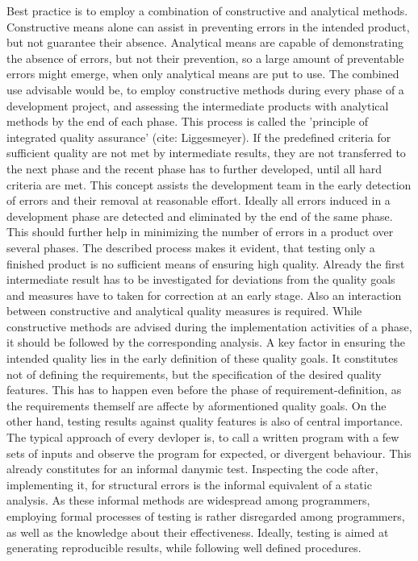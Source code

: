 \documentclass[master,english,smartquotes,apa]{hgbthesis}
\begin{document}
Best practice is to employ a combination of constructive and analytical methods. Constructive means alone can assist in preventing errors in the intended product, but not guarantee their absence. Analytical means are capable of demonstrating the absence of errors, but not their prevention, so a large amount of preventable errors might emerge, when only analytical means are put to use. The combined use advisable would be, to employ constructive methods during every phase of a development project, and assessing the intermediate products with analytical methods by the end of each phase. This process is called the 'principle of integrated quality assurance' (cite: Liggesmeyer). If the predefined criteria for sufficient quality are not met by intermediate results, they are not transferred to the next phase and the recent phase has to further developed, until all hard criteria are met. This concept assists the development team in the early detection of errors and their removal at reasonable effort. Ideally all errors induced in a development phase are detected and eliminated by the end of the same phase. This should further help in minimizing the number of errors in a product over several phases.
The described process makes it evident, that testing only a finished product is no sufficient means of ensuring high quality. Already the first intermediate result has to be investigated for deviations from the quality goals and measures have to taken for correction at an early stage. Also an interaction between constructive and analytical quality measures is required. While constructive methods are advised during the implementation activities of a phase, it should be followed by the corresponding analysis.
A key factor in ensuring the intended quality lies in the early definition of these quality goals. It constitutes not of defining the requirements, but the specification of the desired quality features. This has to happen even before the phase of requirement-definition, as the requirements themself are affecte by aformentioned quality goals. On the other hand, testing results against quality features is also of central importance. The typical approach of every devloper is, to call a written program with a few sets of inputs and observe the program for expected, or divergent behaviour. This already constitutes for an informal danymic test. Inspecting the code after, implementing it, for structural errors is the informal equivalent of a static analysis. As these informal methods are widespread among programmers, employing formal processes of testing is rather disregarded among programmers, as well as the knowledge about their effectiveness. Ideally, testing is aimed at generating reproducible results, while following well defined procedures.
\end{document}
